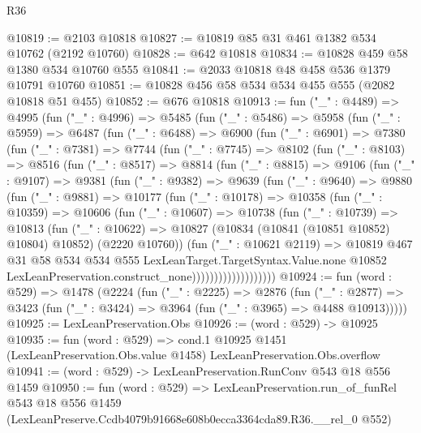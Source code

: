 \begin{lexlean}{R36}
\begin{coremodule}
@10819 := @2103 @10818
@10827 := @10819 @85 @31 @461 @1382 @534 @10762 (@2192 @10760)
@10828 := @642 @10818
@10834 := @10828 @459 @58 @1380 @534 @10760 @555
@10841 := @2033 @10818 @48 @458 @536 @1379 @10791 @10760
@10851 := @10828 @456 @58 @534 @534 @455 @555 (@2082 @10818 @51 @455)
@10852 := @676 @10818
@10913 := fun ("_" : @4489) =>
  @4995
    (fun ("_" : @4996) =>
    @5485
      (fun ("_" : @5486) =>
      @5958
        (fun ("_" : @5959) =>
        @6487
          (fun ("_" : @6488) =>
          @6900
            (fun ("_" : @6901) =>
            @7380
              (fun ("_" : @7381) =>
              @7744
                (fun ("_" : @7745) =>
                @8102
                  (fun ("_" : @8103) =>
                  @8516
                    (fun ("_" : @8517) =>
                    @8814
                      (fun ("_" : @8815) =>
                      @9106
                        (fun ("_" : @9107) =>
                        @9381
                          (fun ("_" : @9382) =>
                          @9639
                            (fun ("_" : @9640) =>
                            @9880
                              (fun ("_" : @9881) =>
                              @10177
                                (fun ("_" : @10178) =>
                                @10358
                                  (fun ("_" : @10359) =>
                                  @10606
                                    (fun ("_" : @10607) =>
                                    @10738
                                      (fun ("_" : @10739) =>
                                      @10813
                                        (fun ("_" : @10622) =>
                                        @10827
                                          (@10834 (@10841 (@10851 @10852) @10804) @10852)
                                          (@2220 @10760))
                                        (fun ("_" : @10621 @2119) =>
                                        @10819
                                          @467
                                          @31
                                          @58
                                          @534
                                          @534
                                          @555
                                          LexLeanTarget.TargetSyntax.Value.none
                                          @10852
                                          LexLeanPreservation.construct_none)))))))))))))))))))
@10924 := fun (word : @529) =>
  @1478
    (@2224
      (fun ("_" : @2225) =>
      @2876
        (fun ("_" : @2877) =>
        @3423 (fun ("_" : @3424) => @3964 (fun ("_" : @3965) => @4488 @10913)))))
@10925 := LexLeanPreservation.Obs
@10926 := (word : @529) -> @10925
@10935 := fun (word : @529) =>
  cond.{1} @10925 @1451 (LexLeanPreservation.Obs.value @1458) LexLeanPreservation.Obs.overflow
@10941 := (word : @529) -> LexLeanPreservation.RunConv @543 @18 @556 @1459
@10950 := fun (word : @529) =>
  LexLeanPreservation.run_of_funRel
    @543
    @18
    @556
    @1459
    (LexLeanPreserve.Ccdb4079b91668e608b0ecca3364cda89.R36.__rel_0 @552)
\end{coremodule}
\end{lexlean}
